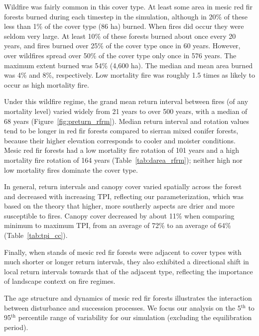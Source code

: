 Wildfire was fairly common in this cover type. At least some area in mesic red fir forests burned during each timestep in the simulation, although in 20\% of these less than 1\% of the cover type (86 ha) burned. When fires did occur they were seldom very large. At least 10\% of these forests burned about once every 20 years, and fires burned over 25\% of the cover type once in 60 years. However, over wildfires spread over 50\% of the cover type only once in 576 years. The maximum extent burned was 54\% (4,600 ha). The median and mean area burned was 4\% and 8\%, respectively. Low mortality fire was roughly 1.5 times as likely to occur as high mortality fire.

Under this wildfire regime, the grand mean return interval between fires (of any mortality level) varied widely from 21 years to over 500 years, with a median of 68 years (Figure~\ref{fig:preturn_rfrm}). Median return interval and rotation values tend to be longer in red fir forests compared to sierran mixed conifer forests, because their higher elevation corresponds to cooler and moister conditions. Mesic red fir forests had a low mortality fire rotation of 101 years and a high mortality fire rotation of 164 years (Table~\ref{tab:darea_rfrm}); neither high nor low mortality fires dominate the cover type. 

In general, return intervals and canopy cover varied spatially across the forest and decreased with increasing TPI, reflecting our parameterization, which was based on the theory that higher, more southerly aspects are drier and more susceptible to fires. Canopy cover decreased by about 11\% when comparing minimum to maximum TPI, from an average of 72\% to an average of 64\% (Table~\ref{tab:tpi_cc}). 

Finally, when stands of mesic red fir forests were adjacent to cover types with much shorter or longer return intervals, they also exhibited a directional shift in local return intervals towards that of the adjacent type, reflecting the importance of landscape context on fire regimes.

The age structure and dynamics of mesic red fir forests illustrates the interaction between disturbance and succession processes. We focus our analysis on the 5$^{\text{th}}$ to 95$^{\text{th}}$ percentile range of variability for our simulation (excluding the equilibration period).

